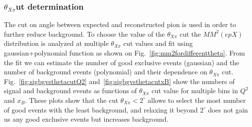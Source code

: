     \subsubsection{\texorpdfstring{$\theta_{X\pi}$} cut determination}
    
    The cut on angle between expected and reconstructed pion is used in order to further reduce background.
    To choose the value of the $\theta_{X\pi}$ cut the $MM^2(epX)$ distribution is analyzed at multiple $\theta_{X\pi}$ cut values and fit using gaussian+polynomial function as shown on Fig.~\ref{fig:mm2fordifferenttheta}.
    From the fit we can estimate the number of good exclusive events (gaussian) and the number of background events (polynomial) and their dependence on $\theta_{X\pi}$ cut.
    Fig.~\ref{fig:sigbgvsthetacutQ2} and~\ref{fig:sigbgvsthetacutxB} show the numbers of signal and background events as functions of $\theta_{X\pi}$ cut value for multiple bins in $Q^2$ and $x_B$.
    These plots show that the cut $\theta_{X\pi}<2^\circ$ allows to select the most number of good events with the least background, and relaxing it beyond $2^\circ$ does not gain us any good exclusive events but increases background.
    
